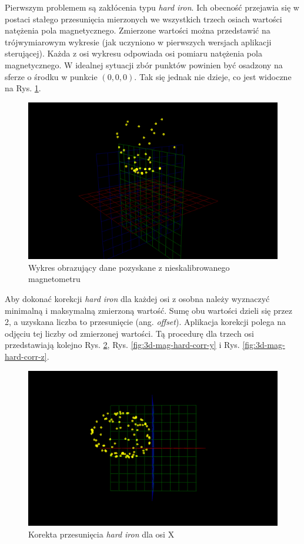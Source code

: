 Pierwszym problemem są zakłócenia typu \emph{hard iron}. Ich obecność przejawia się w postaci stałego przesunięcia mierzonych we wszystkich trzech osiach wartości natężenia pola magnetycznego. Zmierzone wartości można przedstawić na trójwymiarowym wykresie (jak uczyniono w pierwszych wersjach aplikacji sterującej). Każda z osi wykresu odpowiada osi pomiaru natężenia pola magnetycznego. W idealnej sytuacji zbór punktów powinien być osadzony na sferze o środku w punkcie $(0,0,0)$. Tak się jednak nie dzieje, co jest widoczne na Rys. \ref{fig:3d-mag-no-cal}.

\begin{figure}[ht]
	\centering
		\includegraphics[width=0.6\linewidth]{rys/ScanBot-03-magnetometer-3d-decalibrated.PNG}
	\caption{Wykres obrazujący dane pozyskane z nieskalibrowanego magnetometru}
	\label{fig:3d-mag-no-cal}
\end{figure}

Aby dokonać korekcji \emph{hard iron} \cite{hard-iron}\cite{hard-soft-iron} dla każdej osi z osobna należy wyznaczyć minimalną i maksymalną zmierzoną wartość. Sumę obu wartości dzieli się przez 2, a uzyskana liczba to przesunięcie (ang. \emph{offset}). Aplikacja korekcji polega na odjęciu tej liczby od zmierzonej wartości.
Tą procedurę dla trzech osi przedstawiają kolejno Rys. \ref{fig:3d-mag-hard-corr-x}, Rys. \ref{fig:3d-mag-hard-corr-y} i Rys. \ref{fig:3d-mag-hard-corr-z}.

\begin{figure}[H]
	\centering
		\includegraphics[width=0.6\linewidth]{rys/ScanBot-04-magnetometer-3d-calibration.PNG}
	\caption{Korekta przesunięcia \emph{hard iron} dla osi X}
	\label{fig:3d-mag-hard-corr-x}
\end{figure}

